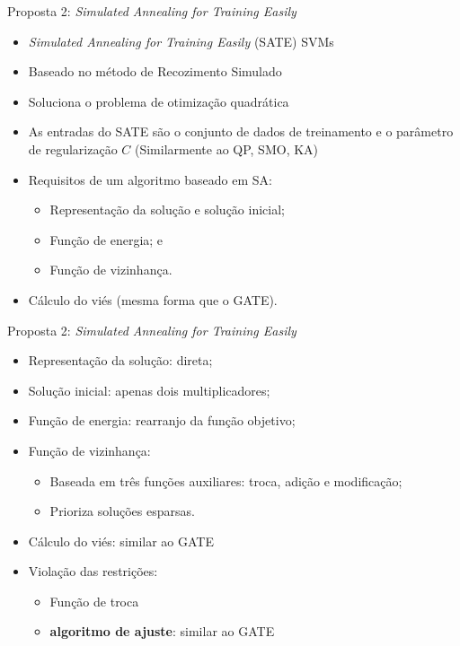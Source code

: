 \documentclass{beamer}
\begin{document}
\begin{frame}{Proposta 2: \textit{Simulated Annealing for Training Easily}}
  \begin{itemize}
    \item \textit{Simulated Annealing for Training Easily} (SATE) SVMs
    \item Baseado no método de Recozimento Simulado
    \item Soluciona o problema de otimização quadrática
    \item As entradas do SATE são o conjunto de dados de treinamento e o parâmetro de regularização $C$ (Similarmente ao QP, SMO, KA)
    \item Requisitos de um algoritmo baseado em SA:
      \begin{itemize}
        \item Representação da solução e solução inicial;
        \item Função de energia; e
        \item Função de vizinhança.
      \end{itemize}
    \item Cálculo do viés (mesma forma que o GATE).
  \end{itemize}
\end{frame}

\begin{frame}{Proposta 2: \textit{Simulated Annealing for Training Easily}}
  \begin{itemize}
    \item Representação da solução: direta;
    \item Solução inicial: apenas dois multiplicadores;
    \item Função de energia: rearranjo da função objetivo;
    \item Função de vizinhança: 
    \begin{itemize}
      \item Baseada em três funções auxiliares: troca, adição e modificação;
      \item Prioriza soluções esparsas.
    \end{itemize}
    \item Cálculo do viés: similar ao GATE
    \item Violação das restrições:
    \begin{itemize}
      \item Função de troca
      \item \textbf{algoritmo de ajuste}: similar ao GATE
    \end{itemize}
  \end{itemize}
\end{frame}
\end{document}
